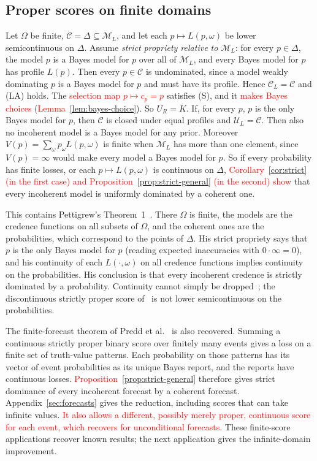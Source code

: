 \documentclass[11pt]{article}
\theoremstyle{definition}
\theoremstyle{remark}
\newcommand{\M}{\mathcal M}
\newcommand{\C}{\mathcal C}
\newcommand{\U}{\mathcal U}
\begin{document}
\subsection{Proper scores on finite domains}\label{sec:proper}
Let $\Omega$ be finite, $\C=\Delta\subseteq\M_L$, and let each $p\mapsto L(p,\omega)$ be lower semicontinuous on $\Delta$. Assume \emph{strict propriety relative to $\M_L$}: for every $p\in\Delta$, the model $p$ is a Bayes model for $p$ over all of $\M_L$, and every Bayes model for $p$ has profile $L(p)$. Then every $p\in\C$ is undominated, since a model weakly dominating $p$ is a Bayes model for $p$ and must have its profile. Hence $\C_L=\C$ and (LA) holds. The \textcolor{red}{selection map $p\mapsto c_p=p$} satisfies (S), and it \textcolor{red}{makes Bayes choices} (\textcolor{red}{Lemma~\ref{lem:bayes-choice}}). So $U_R=K$. If, for every $p$, $p$ is the only Bayes model for $p$, then $\C$ is closed under equal profiles and $\U_L=\C$. Then also no incoherent model is a Bayes model for any prior. Moreover $V(p)=\sum_\omega p_\omega L(p,\omega)$ is finite when $\M_L$ has more than one element, since $V(p)=\infty$ would make every model a Bayes model for $p$. So if every probability has finite losses, or each $p\mapsto L(p,\omega)$ is continuous on $\Delta$, \textcolor{red}{Corollary~\ref{cor:strict} (in the first case) and Proposition~\ref{prop:strict-general} (in the second) show} that every incoherent model is uniformly dominated by a coherent one.

This contains Pettigrew's Theorem~1~\cite{Pettigrew}. There $\Omega$ is finite, the models are the credence functions on all subsets of $\Omega$, and the coherent ones are the probabilities, which correspond to the points of $\Delta$. His strict propriety says that $p$ is the only Bayes model for $p$ (reading expected inaccuracies with $0\cdot\infty=0$), and his continuity of each $L(\cdot,\omega)$ on all credence functions implies continuity on the probabilities. His conclusion is that every incoherent credence is strictly dominated by a probability. Continuity cannot simply be dropped~\cite{SSK09}; the discontinuous strictly proper score of~\cite[Example~4]{SSK09} is not lower semicontinuous on the probabilities.

The finite-forecast theorem of Predd et al.~\cite[Theorem~1]{Predd} is also recovered. Summing a continuous strictly proper binary score over finitely many events gives a loss on a finite set of truth-value patterns. Each probability on those patterns has its vector of event probabilities as its unique Bayes report, and the reports have continuous losses. \textcolor{red}{Proposition~\ref{prop:strict-general}} therefore gives strict dominance of every incoherent forecast by a coherent forecast. Appendix~\ref{sec:forecasts} gives the reduction, including scores that can take infinite values. \textcolor{red}{It also allows a different, possibly merely proper, continuous score for each event, which recovers \cite[Theorem~2, Conclusion~3]{SSK09} for unconditional forecasts.} These finite-score applications recover known results; the next application gives the infinite-domain improvement.
\end{document}
